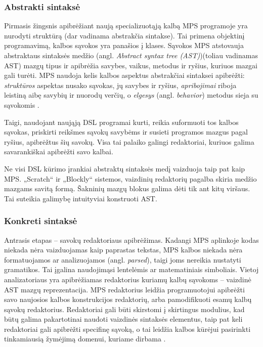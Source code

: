 \documentclass{VUMIFPSkursinis}
\begin{document}
\subsubsection{Abstrakti sintaksė}
Pirmasis žingsnis apibrėžiant naują specializuotąją kalbą MPS programoje yra nurodyti struktūrą (dar vadinama abstrakčia sintakse). Tai primena objektinį programavimą, kalbos sąvokos yra panašios į klases. Sąvokos MPS atstovauja abstraktaus sintaksės medžio (angl. \textit{Abstract syntax tree (AST)})(toliau vadinamas AST) mazgų tipus ir apibrėžia savybes, vaikus, metodus ir ryšius, kuriuos mazgai gali turėti. MPS naudoja kelis kalbos aspektus abstrakčiai sintaksei apibrėžti: \textit{struktūros} aspektas nusako sąvokas, jų savybes ir ryšius, \textit{apribojimai} riboja leistiną aibę savybių ir nuorodų verčių, o \textit{elgesys} (angl. \textit{behavior}) metodus sieja su sąvokomis \cite{10.1145/2500828.2500846}.

Taigi, naudojant naująją DSL programai kurti, reikia suformuoti tos kalbos sąvokas, priskirti reikšmes sąvokų savybėms ir susieti programos mazgus pagal ryšius, apibrėžtus šių savokų. Visa tai palaiko galingi redaktoriai, kuriuos galima savarankiškai apibrėžti savo kalbai.

Ne visi DSL kūrimo įrankiai abstraktų sintaksės medį vaizduoja taip pat kaip MPS. „Scratch“ ir „Blockly“ sistemos, vaizdinių redaktorių pagalba skiria medžio mazgams savitą formą. Šakninių mazgų blokus galima dėti tik ant kitų viršaus. Tai suteikia galimybę intuityviai konstruoti AST.

\subsubsection{Konkreti sintaksė}
Antrasis etapas -- savokų redaktoriaus apibrėžimas. Kadangi MPS aplinkoje kodas niekada nėra vaizduojamas kaip paprastas tekstas, MPS kalbos niekada nėra formatuojamos ar analizuojamos (angl. \textit{parsed}), taigi joms nereikia nustatyti gramatikos. Tai įgalina naudojimąsi lentelėmis ar matematiniais simboliais. Vietoj analizatoriaus yra apibrėžiamas redaktorius kuriamų kalbų sąvokoms -- vaizdinė AST mazgų reprezentacija. MPS redaktorius leidžia programuotojui apibrėžti savo naujosios kalbos konstrukcijos redaktorių, arba pamodifikuoti esamų kalbų sąvokų redaktorius. Redaktoriai gali būti skirstomi į skirtingus modulius, kad būtų galima pakartotinai naudoti vaizdinės sintaksės elementus, taip pat keli redaktoriai gali apibrėžti specifinę sąvoką, o tai leidžia kalbos kūrėjui pasirinkti tinkamiausią žymėjimą domenui, kuriame dirbama \cite{10.1145/2500828.2500846}.
\end{document}
